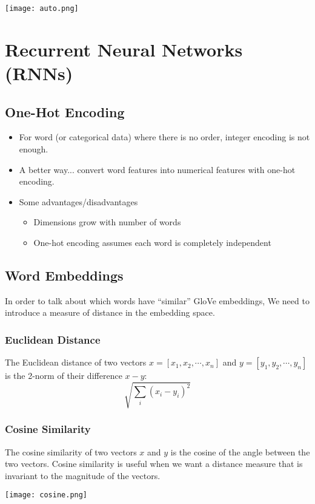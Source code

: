 \documentclass[11pt]{article}
\begin{document}
\begin{center}
\texttt{[image: auto.png]}
\end{center}


\pagebreak

\section{Recurrent Neural Networks (RNNs)}

\subsection{One-Hot Encoding}
\begin{itemize}
\item For word (or categorical data) where there is no order, integer encoding is not enough.
\item A better way... convert word features into numerical features with one-hot encoding. 
\item Some advantages/disadvantages
\begin{itemize}
\item Dimensions grow with number of words
\item One-hot encoding assumes each word is completely independent
\end{itemize}
\end{itemize}

\subsection{Word Embeddings}
In order to talk about which words have “similar” GloVe embeddings, We need to introduce a measure of distance in the embedding space.

\subsubsection{Euclidean Distance}
The Euclidean distance of two vectors $x = [x_1, x_2, \cdots, x_n]$ and $y = [y_1, y_2,  \cdots, y_n]$ is the 2-norm of their difference $x-y$:
$$\sqrt{\sum_i (x_i - y_i)^2}$$
\subsubsection{Cosine Similarity}
The cosine similarity of two vectors $x$ and $y$ is the cosine of the angle between the two vectors.  Cosine similarity is useful when we want a distance measure that is invariant to the magnitude of the vectors.
\begin{center}
\texttt{[image: cosine.png]}
\end{center}
\end{document}
